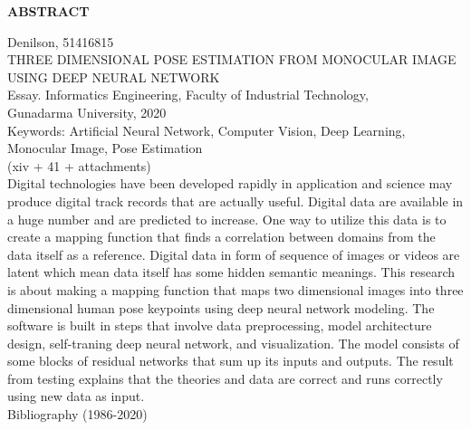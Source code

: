 \newpage %
\begin{center}
    \begin{large}\textbf{ABSTRACT}\end{large}
\end{center}

\vspace{5mm}

\noindent Denilson, 51416815 \\
THREE DIMENSIONAL POSE ESTIMATION FROM MONOCULAR IMAGE USING DEEP NEURAL NETWORK\\
Essay. Informatics Engineering, Faculty of Industrial Technology, \\
Gunadarma University, 2020\\
Keywords: Artificial Neural Network, Computer Vision, Deep Learning, Monocular Image, Pose Estimation\\
\noindent (xiv + 41 + attachments)\\

Digital technologies have been developed rapidly in application and science may produce digital track
records that are actually useful. Digital data are available in a huge number and are predicted to increase.
One way to utilize this data is to create a mapping function that finds a correlation between domains
from the data itself as a reference. Digital data in form of sequence of images or videos are latent
which mean data itself has some hidden semantic meanings. This research is about making a mapping
function that maps two dimensional images into three dimensional human pose keypoints using
deep neural network modeling. The software is built in steps that involve data preprocessing,
model architecture design, self-traning deep neural network, and visualization. The model consists of
some blocks of residual networks that sum up its inputs and outputs. The result from testing explains
that the theories and data are correct and runs correctly using new data as input.\\

\noindent Bibliography (1986-2020)